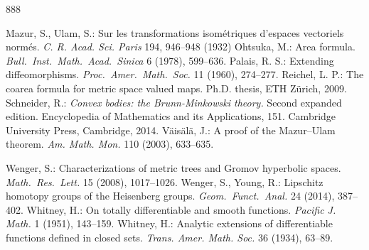 \documentclass[12pt,leqno]{amsart}
\theoremstyle{definition}
\numberwithin{theorem}{section} \numberwithin{equation}{section}
\begin{document}
\begin{thebibliography}{888}
%



%
%
{\sc Mazur, S., Ulam, S.:}
Sur les transformations isom\'etriques d’espaces vectoriels norm\'es. {\em C. R. Acad. Sci. Paris} 194, 946–948 (1932)
%
{\sc Ohtsuka, M.:}
Area formula.
{\em Bull.\ Inst.\ Math.\ Acad.\ Sinica} 6 (1978), 599--636.
%
{\sc Palais, R. S.:}
Extending diffeomorphisms.
{\em Proc.\ Amer.\ Math.\ Soc.} 11 (1960), 274--277.
%
{\sc Reichel, L. P.:}
The coarea formula for metric space valued maps. Ph.D. thesis, ETH Z\"urich, 2009.
%
{\sc Schneider, R.:} {\em Convex bodies: the Brunn-Minkowski theory.} Second expanded edition. Encyclopedia of Mathematics and its Applications, 151. Cambridge University Press, Cambridge, 2014.
%
{\sc V\"ais\"al\"a, J.:}
A proof of the Mazur–Ulam theorem. {\em Am. Math. Mon.} 110 (2003), 633--635.

{\sc Wenger, S.:} Characterizations of metric trees and Gromov hyperbolic spaces. {\em Math.\ Res.\ Lett.} 15 (2008), 1017--1026.
%
{\sc Wenger, S., Young, R.:} Lipschitz homotopy groups of the Heisenberg groups. {\em Geom.\ Funct.\ Anal.} 24 (2014), 387--402.
%
{\sc Whitney, H.:}
On totally differentiable and smooth functions. {\em Pacific J. Math.} 1 (1951), 143--159.
%
{\sc Whitney, H.:}
Analytic extensions of differentiable functions defined in closed sets.
\emph{Trans. Amer. Math. Soc.} 36 (1934), 63--89.
%

\end{thebibliography}
\end{document}
